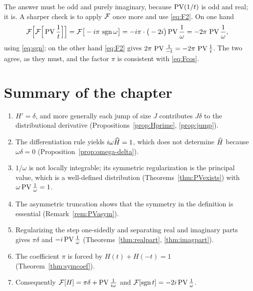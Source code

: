 \begin{remark}
The answer must be odd and purely imaginary, because $\operatorname{PV}(1/t)$ is odd and real; it is. A sharper
check is to apply $\mathcal{F}$ once more and use \eqref{eq:F2}. On one hand
\begin{equation}
\mathcal{F}\Big[\mathcal{F}\Big[\operatorname{PV}\frac{1}{t}\Big]\Big]=\mathcal{F}\big[-i\pi\,\operatorname{sgn}\omega\big]=-i\pi\cdot\big(-2i\big)\operatorname{PV}\frac{1}{\omega}
=-2\pi\,\operatorname{PV}\frac{1}{\omega},
\end{equation}
using \eqref{eq:sgn}; on the other hand \eqref{eq:F2} gives
$2\pi\,\operatorname{PV}\frac{1}{-t}=-2\pi\,\operatorname{PV}\frac{1}{t}$. The two agree, as they must, and the factor
$\pi$ is consistent with \eqref{eq:Fcos}.
\end{remark}

\section{Summary of the chapter}

\begin{enumerate}
\item $H'=\delta$, and more generally each jump of size $J$ contributes $J\delta$ to the
distributional derivative (Propositions~\ref{prop:Hprime}, \ref{prop:jump}).
\item The differentiation rule yields $i\omega\widehat{H}=1$, which does not determine $\widehat{H}$ because
$\omega\delta=0$ (Proposition~\ref{prop:omega-delta}).
\item $1/\omega$ is not locally integrable; its symmetric regularization is the principal value,
which is a well-defined distribution (Theorems~\ref{thm:PVexists}) with
$\omega\operatorname{PV}\frac{1}{\omega}=1$.
\item The asymmetric truncation shows that the symmetry in the definition is essential
(Remark~\ref{rem:PVasym}).
\item Regularizing the step one-sidedly and separating real and imaginary parts gives
$\pi\delta$ and $-i\operatorname{PV}\frac{1}{\omega}$ (Theorems~\ref{thm:realpart}, \ref{thm:imagpart}).
\item The coefficient $\pi$ is forced by $H(t)+H(-t)=1$ (Theorem~\ref{thm:symcoef}).
\item Consequently $\mathcal{F}[H]=\pi\delta+\operatorname{PV}\frac{1}{i\omega}$ and
$\mathcal{F}[\operatorname{sgn} t]=-2i\operatorname{PV}\frac{1}{\omega}$.
\end{enumerate}

